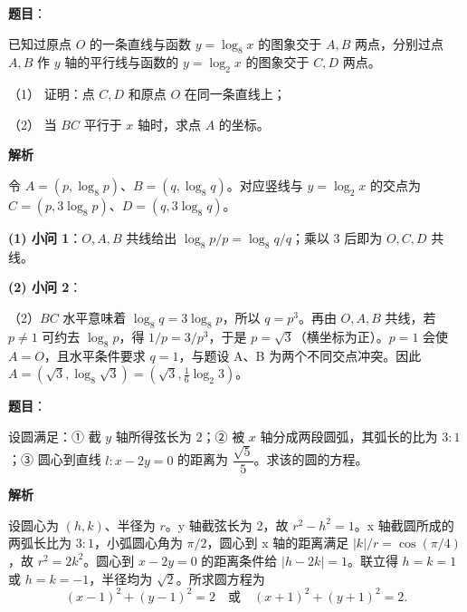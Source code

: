 \begin{answer}

\textbf{题目}：

已知过原点 $O$ 的一条直线与函数 $y=\log_8x$ 的图象交于 $A,B$ 两点，分别过点 $A,B$ 作 $y$ 轴的平行线与函数的 $y=\log_2x$ 的图象交于 $C,D$ 两点。

（1） 证明：点 $C,D$ 和原点 $O$ 在同一条直线上；

（2） 当 $BC$ 平行于 $x$ 轴时，求点 $A$ 的坐标。

\textbf{解析}

令 $A=(p,\log_8p)$、$B=(q,\log_8q)$。对应竖线与 $y=\log_2x$ 的交点为 $C=(p,3\log_8p)$、$D=(q,3\log_8q)$。

\textbf{(1) 小问 1}：$O,A,B$ 共线给出 $\log_8p/p=\log_8q/q$；乘以 3 后即为 $O,C,D$ 共线。

\textbf{(2) 小问 2}：

（2）$BC$ 水平意味着 $\log_8q=3\log_8p$，所以 $q=p^3$。再由 $O,A,B$ 共线，若 $p\ne1$ 可约去 $\log_8p$，得 $1/p=3/p^3$，于是 $p=\sqrt3$（横坐标为正）。$p=1$ 会使 $A=O$，且水平条件要求 $q=1$，与题设 A、B 为两个不同交点冲突。因此 $A=(\sqrt3,\log_8\sqrt3)=(\sqrt3,\frac16\log_2 3)$。



\end{answer}
\begin{answer}

\textbf{题目}：

设圆满足：① 截 $y$ 轴所得弦长为 $2$；② 被 $x$ 轴分成两段圆弧，其弧长的比为 $3:1$；③ 圆心到直线 $l:x-2y=0$ 的距离为 $\dfrac{\sqrt5}{5}$。求该的圆的方程。

\textbf{解析}

设圆心为 $(h,k)$、半径为 $r$。y 轴截弦长为 2，故 $r^2-h^2=1$。x 轴截圆所成的两弧长比为 $3:1$，小弧圆心角为 $\pi/2$，圆心到 x 轴的距离满足 $|k|/r=\cos(\pi/4)$，故 $r^2=2k^2$。圆心到 $x-2y=0$ 的距离条件给 $|h-2k|=1$。联立得 $h=k=1$ 或 $h=k=-1$，半径均为 $\sqrt2$。所求圆方程为
\nopagebreak[4]
\[
(x-1)^2+(y-1)^2=2\quad\text{或}\quad(x+1)^2+(y+1)^2=2.
\]


\end{answer}